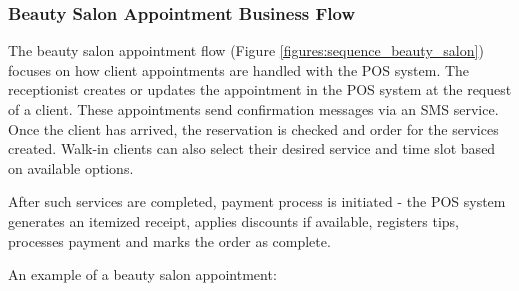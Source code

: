 \documentclass[11pt,a4paper,pdftex]{article}
\begin{document}
\subsubsection{Beauty Salon Appointment Business Flow}

The beauty salon appointment flow (Figure \ref{figures:sequence_beauty_salon}) focuses on how client appointments are handled with the POS system. The receptionist creates or updates the appointment in the POS system at the request of a client. These appointments send confirmation messages via an SMS service. Once the client has arrived, the reservation is checked and order for the services created. Walk-in clients can also select their desired service and time slot based on available options. 

After such services are completed, payment process is initiated - the POS system generates an itemized receipt, applies discounts if available, registers tips, processes payment and marks the order as complete.

An example of a beauty salon appointment:
\end{document}
